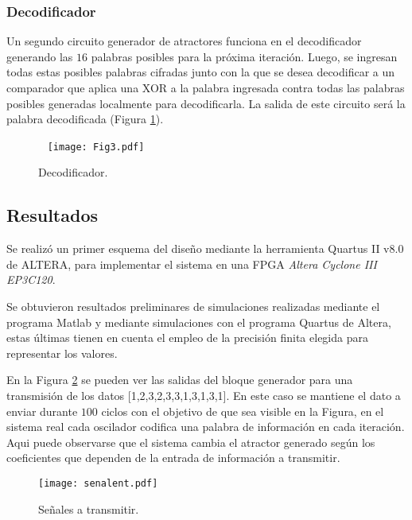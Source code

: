 \subsubsection{Decodificador}

Un segundo circuito generador de atractores funciona en el decodificador generando las $16$ palabras posibles para la próxima iteración.
Luego, se ingresan todas estas posibles palabras cifradas junto con la que se desea decodificar a un comparador que aplica una XOR a la palabra ingresada contra todas las palabras posibles generadas localmente para decodificarla.
La salida de este circuito será la palabra decodificada (Figura \ref{fig:decodificador}).
%
\begin{figure}\
    \centering
    \texttt{[image: Fig3.pdf]}\\
    \caption{Decodificador.}\label{fig:decodificador}
\end{figure}

\subsection{Resultados}

Se realizó un primer esquema del diseño mediante la herramienta Quartus II v8.0 de ALTERA, para implementar el sistema en una FPGA \emph{Altera Cyclone III EP3C120}.

Se obtuvieron resultados preliminares de simulaciones realizadas mediante el programa Matlab y mediante simulaciones con el programa Quartus de Altera, estas últimas tienen en cuenta el empleo de la precisión finita elegida para representar los valores.

En la Figura \ref{senal} se pueden ver las salidas del bloque generador para una transmisión de los datos [1,2,3,2,3,3,1,3,1,3,1].
En este caso se mantiene el dato a enviar durante $100$ ciclos con el objetivo de que sea visible en la Figura, en el sistema real cada oscilador codifica una palabra de información en cada iteración.
Aqui puede observarse que el sistema cambia el atractor generado según los coeficientes que dependen de la entrada de información a transmitir.
%
\begin{figure}
	\centering
	\texttt{[image: senalent.pdf]}\\
	\caption{Señales a transmitir.}\label{senal}
\end{figure}